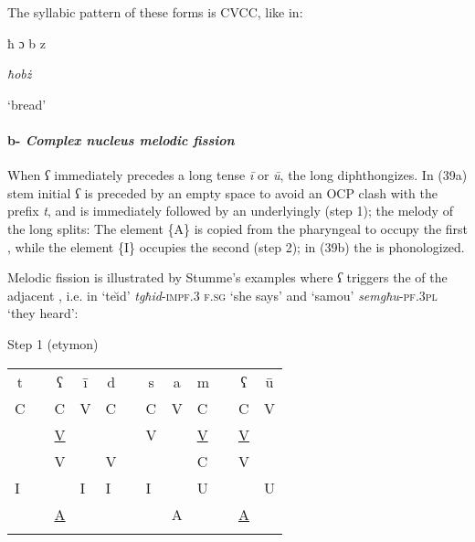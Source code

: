 \documentclass[output=paper]{langsci/langscibook}
\begin{document}
The syllabic pattern of these forms is CVCC, like in:


\ea%
    \label{ex:puech:33}
\parbox{2cm}{ħ  ɔ  b  z}\parbox{1.5cm}{\textit{ħobż}}\parbox{2cm}{‘bread’}
\z

\paragraph{b-  \textit{Complex nucleus melodic fission}}
When \textit{ʕ} immediately precedes a long tense  \textit{ī} or \textit{ū}, the long  diphthongizes. In (39a) stem initial \textit{ʕ} is preceded by an empty space to avoid an OCP clash with the prefix \textit{t}, and is immediately followed by an underlyingly  (step 1); the melody of the long  splits: The element \{A\} is copied from the pharyngeal  to occupy the first , while the element \{I\} occupies the second  (step 2); in (39b) the  is phonologized.

Melodic fission is illustrated by Stumme's examples where  \textit{ʕ} triggers the  of the adjacent , i.e. in ‘t{\З}{e}\u{\i}d’ \textit{tgħid}-\textsc{impf}.3 \textsc{f.sg} ‘she says’ and ‘sam{\З}{ou’} \textit{semgħu}-\textsc{pf}.3\textsc{pl} ‘they heard’:


\ea%
\ea
Step 1 (etymon)\\


\begin{tabularx}{\textwidth}{|p{4mm}|p{4mm}|p{4mm}|p{4mm}|p{4mm}| c |p{4mm}|p{4mm}|p{4mm}|p{4mm}|p{4mm}|p{4mm}|} 
\multicolumn{1}{c}{t} & \multicolumn{1}{c}{} & \multicolumn{1}{c}{ ʕ} & \multicolumn{1}{c}{ ī} & \multicolumn{1}{c}{ d} & \multicolumn{1}{c}{} & \multicolumn{1}{c}{ s} & \multicolumn{1}{c}{ a} & \multicolumn{1}{c}{ m} & \multicolumn{1}{c}{} & \multicolumn{1}{c}{ ʕ} & \multicolumn{1}{c}{ ū}\\
\hhline{-----~------}
 C &  & C & V & C &  & C & V & C &  & C & V\\
&  & \underline{V} &  &  &  & V &  & \underline{V} &  & \underline{V} & \\
&  & V &  & V &  &  &  & C &  & V & \\
\hhline{-----~------}
 I &  &  & I & I &  & I &  & U &  &  & U\\
&  & \underline{A} &  &  &  &  & A &  &  & \underline{A} & \\
\hhline{-----~------} 
\end{tabularx}
\end{document}
